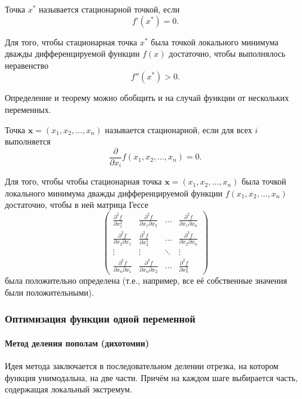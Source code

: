\begin{defn}
Точка $x^{*}$ называется стационарной точкой, если
\[
f\text{'}(x^{*})=0.
\]
\end{defn}
\begin{thm}
Для того, чтобы стационарная точка $x^{*}$ была точкой локального
минимума дважды дифференцируемой функции $f(x)$ достаточно, чтобы
выполнялось неравенство
\[
f''(x^{*})>0.
\]

\end{thm}
Определение и теорему можно обобщить и на случай функции от нескольких
переменных.
\begin{defn}
Точка $\mathbf{x}=(x_{1},x_{2},\dots,x_{n})$ называется стационарной,
если для всех $i$ выполняется 
\[
\frac{\partial}{\partial x_{i}}f(x_{1},x_{2},\dots,x_{n})=0.
\]
\end{defn}
\begin{thm}
Для того, чтобы чтобы стационарная точка $\mathbf{x}=(x_{1},x_{2},\dots,x_{n})$
была точкой локального минимума дважды дифференцируемой функции $f(x_{1},x_{2},\dots,x_{n})$
достаточно, чтобы в ней матрица Гессе 
\[
\begin{pmatrix}\frac{\partial^{2}f}{\partial x_{1}^{2}} & \frac{\partial^{2}f}{\partial x_{1}\partial x_{2}} & \ldots & \frac{\partial^{2}f}{\partial x_{1}\partial x_{n}}\\
\frac{\partial^{2}f}{\partial x_{2}\partial x_{1}} & \frac{\partial^{2}f}{\partial x_{2}^{2}} & \ldots & \frac{\partial^{2}f}{\partial x_{2}\partial x_{n}}\\
\vdots & \vdots & \ddots & \vdots\\
\frac{\partial^{2}f}{\partial x_{n}\partial x_{1}} & \frac{\partial^{2}f}{\partial x_{n}\partial x_{2}} & \ldots & \frac{\partial^{2}f}{\partial x_{n}^{2}}
\end{pmatrix}
\]
была положительно определена (т.е., например, все её собственные значения
были положительными).
\end{thm}

\subsubsection{Оптимизация функции одной переменной}


\paragraph{Метод деления пополам (дихотомии)}

Идея метода заключается в последовательном делении отрезка, на котором
функция унимодальна, на две части. Причём на каждом шаге выбирается
часть, содержащая локальный экстремум.

